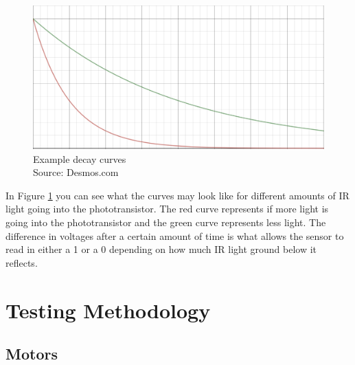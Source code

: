 \documentclass[12pt]{article}
\begin{document}
\begin{figure}[h]
  \begin{center}
  \includegraphics[width=0.5\linewidth]{curves.png}
  \caption{Example decay curves \\ Source: Desmos.com}
  \label{fig:curves}
  \end{center}
\end{figure}
In Figure \ref{fig:curves} you can see what the curves may look like for different amounts of IR light going into the phototransistor. The red curve represents if more light is going into the phototransistor and the green curve represents less light. The difference in voltages after a certain amount of time is what allows the sensor to read in either a 1 or a 0 depending on how much IR light ground below it reflects.

\section{Testing Methodology}
\subsection{Motors}
\end{document}
